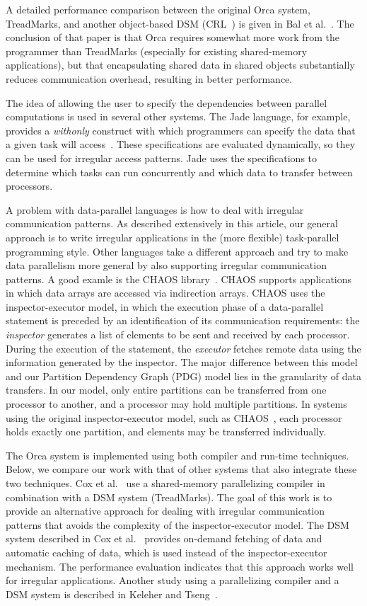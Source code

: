 \documentclass{acmtrans2e}
\begin{document}
A detailed performance comparison between the original Orca system,
TreadMarks, and another object-based DSM (CRL~\cite{Johnson:1995})
is given in Bal et al.~\citeyear{Bal:1998}.
The conclusion of that paper is that Orca requires somewhat more work
from the programmer than TreadMarks (especially for existing
shared-memory applications), but that encapsulating
shared data in shared objects substantially reduces communication overhead,
resulting in better performance.

The idea of allowing the user to specify the dependencies between parallel
computations is used in several other systems.
The Jade language, for example, provides a \emph{withonly} construct
with which programmers can specify the data that a given task
will access~\cite{rinard93}.
These specifications are evaluated dynamically, so they
can be used for irregular access patterns. Jade uses the specifications
to determine which tasks can run concurrently and which data to transfer
between processors.

A problem with data-parallel languages is how to deal with irregular
communication patterns.
As described extensively in this article, our general approach is to write
irregular applications in the (more flexible) task-parallel programming style.
Other languages take a different approach and
try to make data parallelism more general by also supporting
irregular communication patterns. A good examle is
the CHAOS library~\cite{sharma94}.
CHAOS supports applications in which data arrays are
accessed via indirection arrays.
CHAOS uses the inspector-executor model, in which
the execution phase of a data-parallel statement is
preceded by an identification of its communication requirements: the
\emph{inspector} generates a list of elements to be sent and received
by each processor. During the execution of the statement, the
\emph{executor} fetches remote data using the information generated by
the inspector. The major difference between this model and 
our Partition Dependency Graph (PDG) model lies
in the granularity of data transfers. In our model, only entire
partitions can be transferred from one processor to another, and a
processor may hold multiple partitions. In systems using the original
inspector-executor model, such as CHAOS~\cite{sharma94}, each
processor holds exactly one partition, and elements may be transferred
individually.

The Orca system is implemented using both compiler and run-time techniques.
Below, we compare our work with that of other systems that also
integrate these two techniques.
Cox et al.~\citeyear{Cox:1997} use
a shared-memory parallelizing compiler
in combination with a DSM system (TreadMarks). The goal of this work
is to provide an alternative approach for dealing with
irregular communication patterns that
avoids the complexity of the inspector-executor model.
The DSM system described in Cox et al.~\citeyear{Cox:1997}
provides on-demand fetching
of data and automatic caching of data, which is used instead of
the inspector-executor mechanism. The performance evaluation
indicates that this approach works well
for irregular applications.
Another study using a parallelizing compiler and a DSM system
is described in Keleher and Tseng~\citeyear{Keleher:1997}.
\end{document}
